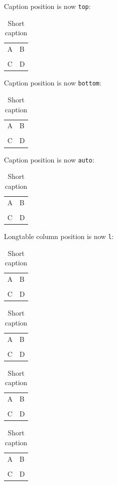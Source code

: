 \documentclass[a4paper]{article}
\def\shorttext{Short caption}
\begin{document}
Caption position is now \texttt{top}:
\captionsetup{position=top}

\begin{longtable}{ll}
A & B \\
\caption{\shorttext}\\
C & D \\
\end{longtable}

Caption position is now \texttt{bottom}:
\captionsetup{position=bottom}

\begin{longtable}{ll}
A & B \\
\caption{\shorttext}\\
C & D \\
\end{longtable}

Caption position is now \texttt{auto}:
\captionsetup{position=auto}

\begin{longtable}{ll}
A & B \\
\caption{\shorttext}\\
C & D \\
\end{longtable}

\iffalse
\clearpage

Longtable column position is now \texttt{l}:
\def\longtablecolumnpos{l}

\begin{longtable}{ll}
A & B \\
\caption{\shorttext}\\
C & D \\
\end{longtable}

\begin{longtable}[l]{ll}
A & B \\
\caption{\shorttext}\\
C & D \\
\end{longtable}

\begingroup
\def\makelongtablecaption#1{\hbox to 0pt{\parbox[t]\linewidth{#1}\hss}}%
\begin{longtable}[l]{ll}
A & B \\
\caption{\shorttext}\\
C & D \\
\end{longtable}
\captionsetup{singlelinecheck=0}
\begin{longtable}[l]{ll}
A & B \\
\caption{\shorttext}\\
C & D \\
\end{longtable}
\endgroup
\end{document}
